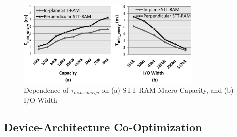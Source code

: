 \begin{figure}[t]
  \centering
  \includegraphics[width=3.5in]{fig/MinEnergy.eps}
  \caption{Dependence of $\tau_{min\_energy}$ on (a) STT-RAM Macro Capacity, and (b) I/O Width}
  \label{fig:minenergy}
\end{figure}

\subsection{Device-Architecture Co-Optimization}

